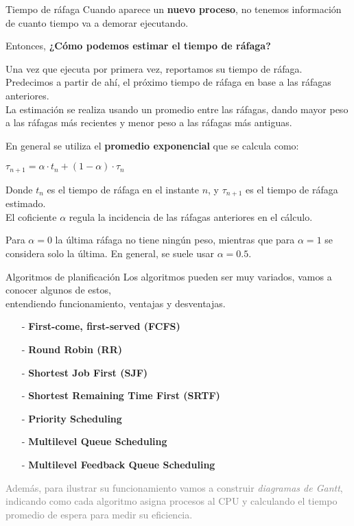 \documentclass[aspectratio=169]{beamer}
\begin{document}
\begin{frame}{Tiempo de ráfaga}
    \small
    Cuando aparece un \textbf{nuevo proceso}, no tenemos información de cuanto tiempo va a demorar ejecutando.
    \begin{center}
    Entonces, \textcolor{naranjauca}{\textbf{¿Cómo podemos estimar el tiempo de ráfaga?}}
    \end{center}
    \pause
    \textcolor{verdeuca}{
    Una vez que ejecuta por primera vez, reportamos su tiempo de ráfaga.\\
    Predecimos a partir de ahí, el próximo tiempo de ráfaga en base a las ráfagas anteriores.\\}
    \medskip
    La estimación se realiza usando un promedio entre las ráfagas, dando mayor peso a las ráfagas más recientes y menor peso a las ráfagas más antiguas.\\
    \pause
    \begin{tcolorbox}[size=small,width=\textwidth,sharp corners,title={}] \small 
    En general se utiliza el \textbf{promedio exponencial} que se calcula como:
    \begin{center}
    { \large $\tau_{n+1} = \alpha \cdot t_n + (1 - \alpha) \cdot \tau_n$ }
    \end{center}
    \footnotesize
    Donde $t_n$ es el tiempo de ráfaga en el instante $n$, y $\tau_{n+1}$ es el tiempo de ráfaga estimado.\\
    El coficiente $\alpha$ regula la incidencia de las ráfagas anteriores en el cálculo.
    \end{tcolorbox}
    Para $\alpha = 0$ la última ráfaga no tiene ningún peso, mientras que para $\alpha = 1$ se considera solo la última.
    En general, se suele usar  $\alpha = 0.5$.    
\end{frame}

\begin{frame}{Algoritmos de planificación}
    Los algoritmos pueden ser muy variados, vamos a conocer algunos de estos,\\
    entendiendo funcionamiento, ventajas y desventajas.\\
    \bigskip
    \begin{itemize}
    \setlength\itemsep{0.15cm}
    \item[-] \textbf{First-come, first-served (FCFS)}
    \item[-] \textbf{Round Robin (RR)}
    \item[-] \textbf{Shortest Job First (SJF)}
    \item[-] \textbf{Shortest Remaining Time First (SRTF)}
    \item[-] \textbf{Priority Scheduling}
    \item[-] \textbf{Multilevel Queue Scheduling}
    \item[-] \textbf{Multilevel Feedback Queue Scheduling}
    \end{itemize}
    \bigskip
    \small
    \textcolor{gray}{Además, para ilustrar su funcionamiento vamos a construir \emph{diagramas de Gantt},
    indicando como cada algoritmo asigna procesos al CPU y calculando el tiempo promedio de espera para medir su eficiencia.}\\
\end{frame}
\end{document}
